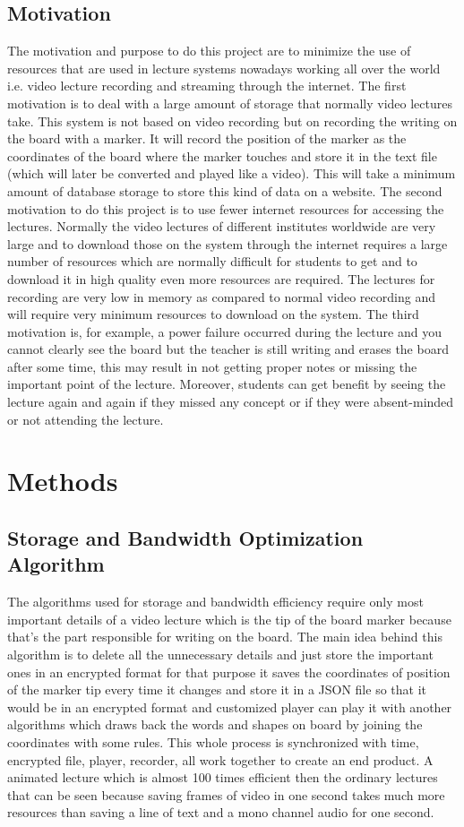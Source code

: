 \documentclass[conference]{IEEEtran}
\begin{document}
\subsection{Motivation}
The motivation and purpose to do this project are to minimize the use of resources that are used in lecture systems nowadays working all over the world i.e. video lecture recording and streaming through the internet. The first motivation is to deal with a large amount of storage that normally video lectures take. This system is not based on video recording but on recording the writing on the board with a marker. It will record the position of the marker as the coordinates of the board where the marker touches and store it in the text file (which will later be converted and played like a video). This will take a minimum amount of database storage to store this kind of data on a website. The second motivation to do this project is to use fewer internet resources for accessing the lectures. Normally the video lectures of different institutes worldwide are very large and to download those on the system through the internet requires a large number of resources which are normally difficult for students to get and to download it in high quality even more resources are required. The lectures for recording are very low in memory as compared to normal video recording and will require very minimum resources to download on the system. The third motivation is, for example, a power failure occurred during the lecture and you cannot clearly see the board but the teacher is still writing and erases the board after some time, this may result in not getting proper notes or missing the important point of the lecture. Moreover, students can get benefit by seeing the lecture again and again if they missed any concept or if they were absent-minded or not attending the lecture.
\section{Methods}
\subsection{Storage and Bandwidth Optimization Algorithm}
The algorithms used for storage and bandwidth efficiency require only most important details of a video lecture which is the tip of the board marker because that's the part responsible for writing on the board. The main idea behind this algorithm is to delete all the unnecessary details and just store the important ones in an encrypted format for that purpose it saves the coordinates of position of the marker tip every time it changes and store it in a JSON file so that it would be in an encrypted format and customized player can play it with another algorithms which draws back the words and shapes on board by joining the coordinates with some rules. This whole process is synchronized with time, encrypted file, player, recorder, all work together to create an end product. A animated lecture which is almost 100 times efficient then the ordinary lectures that can be seen because saving frames of video in one second takes much more resources than saving a line of text and a mono channel audio for one second.
\end{document}
